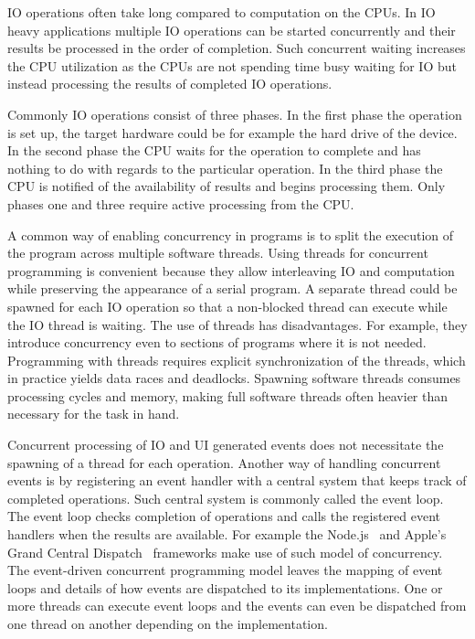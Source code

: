 IO operations often take long compared to computation on the CPUs. In IO heavy applications multiple IO operations can be started concurrently and their results be processed in the order of completion. Such concurrent waiting increases the CPU utilization as the CPUs are not spending time busy waiting for IO but instead processing the results of completed IO operations.~\cite{dabek2002event}

Commonly IO operations consist of three phases. In the first phase the operation is set up, the target hardware could be for example the hard drive of the device. In the second phase the CPU waits for the operation to complete and has nothing to do with regards to the particular operation. In the third phase the CPU is notified of the availability of results and begins processing them. Only phases one and three require active processing from the CPU.~\cite{friesen2015asynchronous}

A common way of enabling concurrency in programs is to split the execution of the program across multiple software threads. Using threads for concurrent programming is convenient because they allow interleaving IO and computation while preserving the appearance of a serial program. A separate thread could be spawned for each IO operation so that a non-blocked thread can execute while the IO thread is waiting. The use of threads has disadvantages. For example, they introduce concurrency even to sections of programs where it is not needed. Programming with threads requires explicit synchronization of the threads, which in practice yields data races and deadlocks. Spawning software threads consumes processing cycles and memory, making full software threads often heavier than necessary for the task in hand.~\cite{dabek2002event, lee2006problem}

Concurrent processing of IO and UI generated events does not necessitate the spawning of a thread for each operation. Another way of handling concurrent events is by registering an event handler with a central system that keeps track of completed operations. Such central system is commonly called the event loop. The event loop checks completion of operations and calls the registered event handlers when the results are available. For example the Node.js~\cite{tilkov2010node} and Apple's Grand Central Dispatch~\cite{sakamoto2012grand} frameworks make use of such model of concurrency. The event-driven concurrent programming model leaves the mapping of event loops and details of how events are dispatched to its implementations. One or more threads can execute event loops and the events can even be dispatched from one thread on another depending on the implementation.

